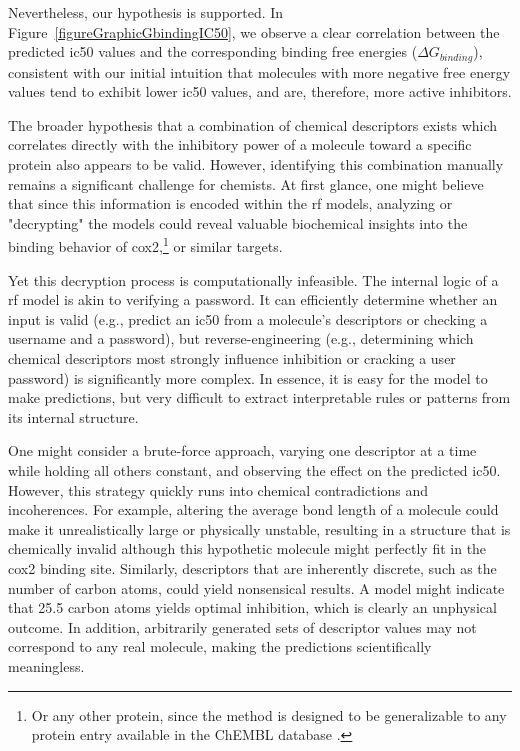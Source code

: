 \documentclass[11pt]{article}
\begin{document}
Nevertheless, our hypothesis is supported. In Figure~\ref{figureGraphicGbindingIC50}, we observe a clear correlation between the predicted \gls{ic50} values and the corresponding binding free energies ($\Delta G_{binding}$), consistent with our initial intuition that molecules with more negative free energy values tend to exhibit lower \gls{ic50} values, and are, therefore, more active inhibitors.

The broader hypothesis that a combination of chemical descriptors exists which correlates directly with the inhibitory power of a molecule toward a specific protein also appears to be valid. However, identifying this combination manually remains a significant challenge for chemists. At first glance, one might believe that since this information is encoded within the \gls{rf} models, analyzing or "decrypting" the models could reveal valuable biochemical insights into the binding behavior of \gls{cox2},\footnote{Or any other protein, since the method is designed to be generalizable to any protein entry available in the ChEMBL database \cite{ChemblDatabase}.} or similar targets.

Yet this decryption process is computationally infeasible. The internal logic of a \gls{rf} model is akin to verifying a password. It can efficiently determine whether an input is valid (e.g., predict an \gls{ic50} from a molecule's descriptors or checking a username and a password), but reverse-engineering (e.g., determining which chemical descriptors most strongly influence inhibition or cracking a user password) is significantly more complex. In essence, it is easy for the model to make predictions, but very difficult to extract interpretable rules or patterns from its internal structure.

One might consider a brute-force approach, varying one descriptor at a time while holding all others constant, and observing the effect on the predicted \gls{ic50}. However, this strategy quickly runs into chemical contradictions and incoherences. For example, altering the average bond length of a molecule could make it unrealistically large or physically unstable, resulting in a structure that is chemically invalid although this hypothetic molecule might perfectly fit in the \gls{cox2} binding site. Similarly, descriptors that are inherently discrete, such as the number of carbon atoms, could yield nonsensical results. A model might indicate that 25.5 carbon atoms yields optimal inhibition, which is clearly an unphysical outcome. In addition, arbitrarily generated sets of descriptor values may not correspond to any real molecule, making the predictions scientifically meaningless.
\end{document}
